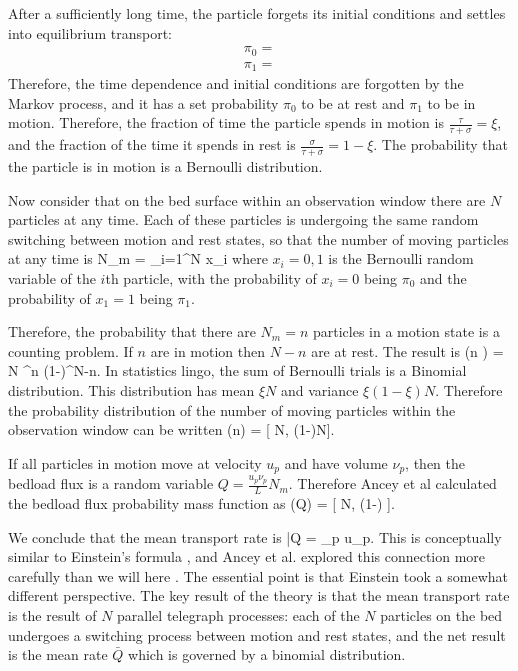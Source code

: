 After a sufficiently long time, the particle forgets its initial conditions and settles into equilibrium transport: 
\begin{align} 
\pi_0 = \\
\pi_1 = 
\end{align}
Therefore, the time dependence and initial conditions are forgotten by the Markov process, and it has a set probability $\pi_0$ to be at rest and $\pi_1$ to be in motion.  
Therefore, the fraction of time the particle spends in motion is $\frac{\tau}{\tau+\sigma} = \xi $, and the fraction of the time it spends in rest is $\frac{\sigma}{\tau+\sigma} = 1-\xi$. 
The probability that the particle is in motion is a Bernoulli distribution. 

Now consider that on the bed surface within an observation window there are $N$ particles at any time. 
Each of these particles is undergoing the same random switching between motion and rest states, so that the number of moving particles at any time is 
\be N_m = \sum_{i=1}^N x_i \ee
where $x_i=0,1$ is the Bernoulli random variable of the $i$th particle, with the probability of $x_i=0$ being $\pi_0$ and the probability of $x_1=1$ being $\pi_1$. 

Therefore, the probability that there are $N_m =n$ particles in a motion state is a counting problem. If $n$ are in motion then $N-n$ are at rest. The result is 
\be {}(n ) = {{N} } \xi^n (1-\xi)^{N-n}. \ee 
In statistics lingo, the sum of Bernoulli trials is a Binomial distribution. 
This distribution has mean $\xi N$ and variance $\xi(1-\xi)N$. 
Therefore the probability distribution of the number of moving particles within the observation window can be written 
\be {}(n) = [ \xi N, \xi(1-\xi)N].  \ee


If all particles in motion move at velocity $u_p$ and have volume $\nu_p$, then the bedload flux is a random variable $Q = \frac{u_p \nu_p}{L} N_m $. Therefore Ancey et al calculated the bedload flux probability mass function as 
\be {}(Q) =  [ \xi N, \xi (1-\xi) ]. \ee

We conclude that the mean transport rate is 
\be \bar{Q} = \nu_p   \frac{\tau}{\tau+\sigma}   u_p. \ee
This is conceptually similar to Einstein's formula \citep{1950}, and Ancey et al. explored this connection more carefully than we will here \citep{Ancey2006}. 
The essential point is that Einstein took a somewhat different perspective.
The key result of the \citet{Ancey2006} theory is that the mean transport rate is the result of $N$ parallel telegraph processes: each of the $N$ particles on the bed undergoes a switching process between motion and rest states, and the net result is the mean rate $\bar{Q}$ which is governed by a binomial distribution. 

